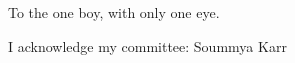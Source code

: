 \begin{dedication}
To the one boy, with only one eye.
\end{dedication}


\begin{acknowledgments}
I acknowledge my committee: Soummya Karr 
\end{acknowledgments}